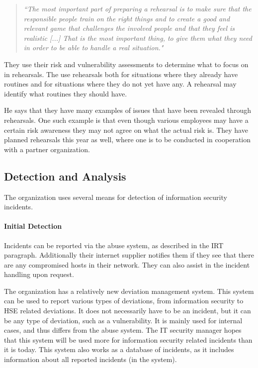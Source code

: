\begin{quote}
\textit{``The most important part of preparing a rehearsal is to make sure that the responsible people train on the right things and to create a good and relevant game that challenges the involved people and that they feel is realistic [...] That is the most important thing, to give them what they need in order to be able to handle a real situation."}
\end{quote}

They use their risk and vulnerability assessments to determine what to focus on in rehearsals. The use rehearsals both for situations where they already have routines and for situations where they do not yet have any. A rehearsal may identify what routines they should have.

He says that they have many examples of issues that have been revealed through rehearsals. One such example is that even though various employees may have a certain risk awareness they may not agree on what the actual risk is. They have planned rehearsals this year as well, where one is to be conducted in cooperation with a partner organization. %

\subsection{Detection and Analysis}
The organization uses several means for detection of information security incidents.

\paragraph{Initial Detection}
Incidents can be reported via the abuse system, as described in the \ac{IRT} paragraph. Additionally their internet supplier notifies them if they see that there are any compromised hosts in their network. They can also assist in the incident handling upon request.

The organization has a relatively new deviation management system. This system can be used to report various types of deviations, from information security to \ac{HSE} related deviations. It does not necessarily have to be an incident, but it can be any type of deviation, such as a vulnerability. It is mainly used for internal cases, and thus differs from the abuse system. The IT security manager hopes that this system will be used more for information security related incidents than it is today. This system also works as a database of incidents, as it includes information about all reported incidents (in the system).  

